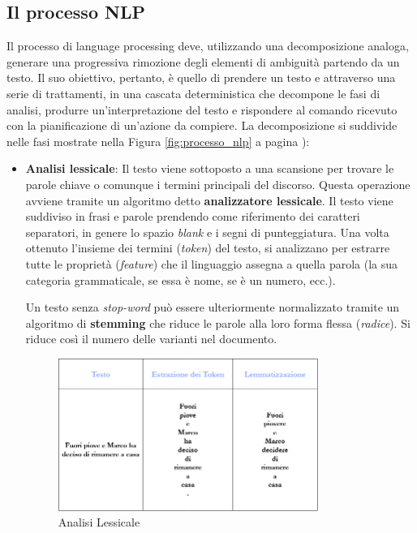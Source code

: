 \subsection{Il processo NLP}
Il processo di language processing deve, utilizzando una decomposizione analoga, generare una progressiva rimozione degli elementi di ambiguità partendo da un testo. Il suo obiettivo, pertanto, è quello di prendere un testo e attraverso una serie di trattamenti, in una cascata deterministica che decompone le fasi di analisi, produrre un’interpretazione del testo e rispondere al comando ricevuto con la pianificazione di un’azione da compiere.
La decomposizione si suddivide nelle fasi mostrate nella Figura \ref{fig:processo_nlp} a pagina \pageref{fig:processo_nlp}):
\begin{itemize}
    \item \textbf{Analisi lessicale}: Il testo viene sottoposto a una scansione per trovare le parole chiave o comunque i termini principali del discorso. Questa operazione avviene tramite un algoritmo detto \textbf{analizzatore lessicale}.
    Il testo viene suddiviso in frasi e parole prendendo come riferimento dei caratteri separatori, in genere lo spazio \textit{blank} e i segni di punteggiatura. 
    Una volta ottenuto l'insieme dei termini (\textit{token}) del testo, si analizzano per estrarre tutte le proprietà (\textit{feature}) che il linguaggio assegna a quella parola (la sua categoria grammaticale, se essa è nome, se è un numero, ecc.).
    
    Un testo senza \textit{stop-word} può essere ulteriormente normalizzato tramite un algoritmo di \textbf{stemming} che riduce le parole alla loro forma flessa (\textit{radice}). Si riduce così il numero delle varianti nel documento.
    
    \begin{figure}[hbt!]
        \centering
        \includegraphics[width=0.8\textwidth]{img/analisi_lessicale.png}
        \caption{Analisi Lessicale}
        \label{fig:analisi_lessicale}
    \end{figure}
    

\end{itemize}
